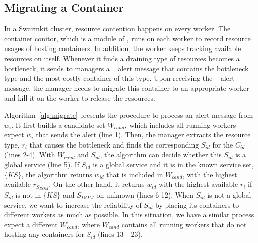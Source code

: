 \subsection{Migrating a Container}
In a Swarmkit cluster, resource contention happens on every worker.
The container conitor, which is a module of \sol, runs on each worker to record resource usages of hosting containers.
In addition, the worker keeps tracking available resources on itself. Whenever it finds a draining type of
resources becomes a bottleneck, it sends to managers a \sol~ alert message that contains the bottleneck type and the
most costly container of this type. Upon receiving the \sol~ alert message, the manager needs
to migrate this container to an appropriate worker and kill it on the worker to release the resources.

Algorithm~\ref{alg:migrate} presents the procedure to process an alert message from $w_i$.
It first builds a candidate set $W_{cand}$, which includes all running workers expect $w_i$ that sends the alert (line 1).
Then, the manager extracts the resource type, $r_i$ that causes the bottleneck and finds the corresponding $S_{id}$ for the $C_{id}$ (lines 2-4).
With $W_{cand}$ and $S_{id}$, the algorithm can decide whether this $S_{id}$ is a global service (line 5).
If $S_{id}$ is a global service and it is in the known service set, $\{KS\}$, the algorithm returns $w_{id}$ that is included in $W_{cand}$,
with the highest available $r_{S_{DOM}}$.
On the other hand, it returns $w_{id}$ with the highest available $r_i$ if $S_{id}$ is not in $\{KS\}$ and $S_{DOM}$ on unknown (lines 6-12).
When $S_{id}$ is not a global service, we want to increase the reliability of $S_{id}$ by placing its containers to different workers as much as possible.
In this situation, we have a similar process expect a different $W_{cand}$, where $W_{cand}$  contains all running
workers that do not hosting any containers for $S_{id}$ (lines 13 - 23).



